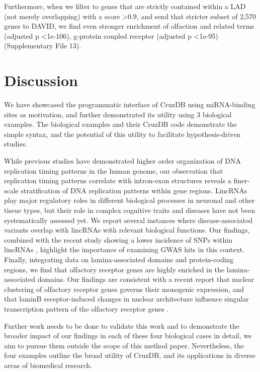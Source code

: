 \documentclass{bioinfo}
\begin{document}
Furthermore, when we filter to genes that are strictly contained within a LAD (not merely overlapping) with a score \textgreater 0.9, and send that stricter subset of 2,570 genes to DAVID, we find even stronger enrichment of olfaction and related terms (adjusted p \textless  1e-106), g-protein coupled recepter (adjusted p \textless  1e-95) (Supplementary File 13).




\section{Discussion}

We have showcased the programmatic interface of CruzDB using miRNA-binding sites as motivation, and further demonstrated its utility using 3 biological examples.
The biological examples and their CruzDB code demonstrate the simple syntax, and the potential of this utility to facilitate hypothesis-driven studies.

While previous studies have demonstrated higher order organization of DNA replication timing patterns in the human genome, our observation that replication timing patterns correlate with intron-exon structures reveals a finer-scale stratification of DNA replication patterns within gene regions. LincRNAs play major regulatory roles in different biological processes in neuronal and other tissue types, but their role in complex cognitive traits and diseases have not been systematically assessed yet. We report several instances where disease-associated variants overlap with lincRNAs with relevant biological functions. Our findings, combined with the recent study showing a lower incidence of SNPs within lincRNAs \citep{Chen}, highlight the importance of examining GWAS hits in this context. Finally, integrating data on lamina-associated domains and protein-coding regions, we find that olfactory receptor genes are highly enriched in the lamina-associated domains. Our findings are consistent with a recent report that nuclear clustering of olfactory receptor genes governs their monogenic expression, and that laminB receptor-induced changes in nuclear architecture influence singular transcription pattern of the olfactory receptor genes \citep{Clowney}. 

Further work needs to be done to validate this work and to demonstrate the broader impact of our findings in each of these four biological cases in detail, we aim to pursue them outside the scope of this method paper. Nevertheless, the four examples outline the broad utility of CruzDB, and its applications in diverse areas of biomedical research.
\end{document}
